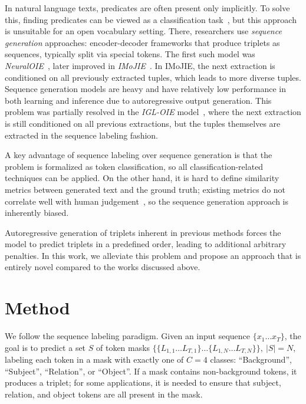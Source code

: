 \documentclass[letterpaper]{article} \usepackage{aaai22}  \usepackage{times}  \usepackage{helvet}  \usepackage{courier}  \usepackage[hyphens]{url}  \usepackage{graphicx} \usepackage{placeins}
\begin{document}
In natural language texts, predicates are often present only implicitly. To solve this, finding predicates can be viewed as a classification task~\cite{zeng2014relation}, but this approach is unsuitable for an open vocabulary setting. There, researchers use \textit{sequence generation} approaches: encoder-decoder frameworks that produce triplets as sequences, typically split via special tokens.
The first such model was \emph{NeuralOIE}~\cite{cui-etal-2018-neural}, later improved in \emph{IMoJIE}~\cite{kolluru2020imojie}. In IMoJIE, the next extraction is conditioned on all previously extracted tuples, which leads to more diverse tuples. Sequence generation models are heavy and have relatively low performance in both learning and inference due to autoregressive output generation. This problem was partially resolved in the \emph{IGL-OIE} model~\cite{kolluru2020openie6}, where the next extraction is still conditioned on all previous extractions, but the tuples themselves are extracted in the sequence labeling fashion.

A key advantage of sequence labeling over sequence generation is that the problem is formalized as token classification, so all classification-related techniques can be applied.
On the other hand, it is hard to define similarity metrics between generated text and the ground truth; existing metrics do not correlate well with human judgement~\cite{mathur2020tangled,lukasik2020semantic}, so the sequence generation approach is inherently biased.

Autoregressive generation of triplets inherent in previous methods forces the model to predict triplets in a predefined order, leading to additional arbitrary penalties.
In this work, we alleviate this problem and propose an approach that is entirely novel compared to the works discussed above.



\section{Method}\label{sec:method}
\def\ntok{n_{\mathrm{tokens}}}
\def\ntrip{n_{\mathrm{triplets}}}
\def\mtrip{m_{\mathrm{triplets}}}
\def\nclass{n_{\mathrm{classes}}}

We follow the sequence labeling paradigm.
Given an input sequence $\{x_1 \dots x_T\}$, the goal is to predict a set $S$ of token masks $\{\{L_{1,1} \dots L_{T,1}\} \dots \{L_{1,N} \dots L_{T,N}\}\}, \ |S|=N$, labeling each token in a mask with exactly one of $C = 4$ classes: ``Background'', ``Subject'', ``Relation'', or ``Object''. If a mask contains non-background tokens, it produces a triplet; for some applications, it is needed to ensure that subject, relation, and object tokens are all present in the mask.
\end{document}
